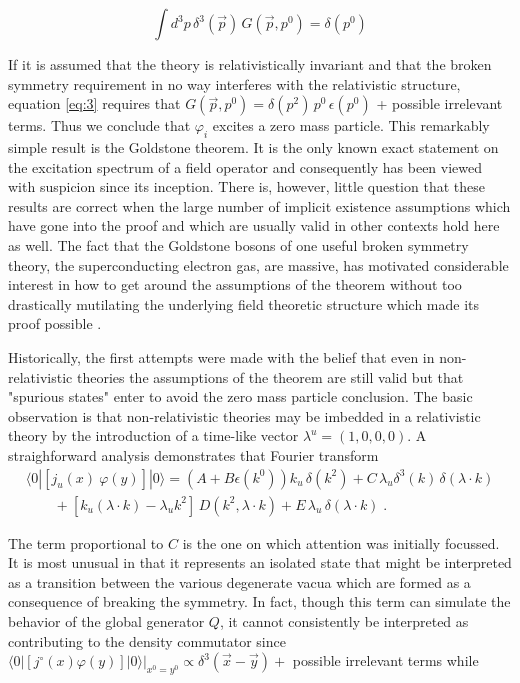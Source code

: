 \documentclass[%
  12pt,
  paper=letter,
  abstracton,
  pagesize=auto,
  version=last,
  DIV=calc
  ]{article}
\begin{document}
\begin{equation}
  \label{eq:3}
  \int d^{3}p\, \delta^{3}(\vec{p})\, G(\vec{p}, p^{0}) = \delta(p^{0})
\end{equation}

If it is assumed that the theory is relativistically invariant and
that the broken symmetry requirement in no way interferes with the
relativistic structure, equation \eqref{eq:3} requires that $G(\vec{p},
p^{0}) = \delta(p^{2})\, p^{0}\, \epsilon(p^{0})$ + possible
irrelevant terms.  Thus we conclude that $\varphi_i$ excites a zero
mass particle.  This remarkably simple result is the Goldstone
theorem.  It is the only known exact statement on the excitation
spectrum of a field operator and consequently has been viewed with
suspicion since its inception.  There is, however, little question
that these results are correct when the large number of implicit
existence assumptions which have gone into the proof and which are
usually valid in other contexts hold here as well.  The fact that the
Goldstone bosons of one useful broken symmetry theory, the
superconducting electron gas, are massive, has motivated considerable
interest in how to get around the assumptions of the theorem without
too drastically mutilating the underlying field theoretic structure
which made its proof possible \cite{5}.

Historically, the first attempts were made with the belief that even
in non-relativistic theories the assumptions of the theorem are still
valid but that "spurious states" enter to avoid the zero mass particle
conclusion.  The basic observation \cite{6} is that non-relativistic
theories may be imbedded in a relativistic theory by the introduction
of a time-like vector $\lambda^{u}=(1,0,0,0)$.  A straighforward
analysis demonstrates that Fourier transform
\begin{multline*}
  \langle 0 |\left[j_{u}
  (x)~\varphi(y)\right]| 0\rangle = (A + B\epsilon(k^{0}))k_{u}\,
  \delta(k^{2}) + C\, \lambda_{u}
  \delta^{3}(k)\, \delta(\lambda\cdot k) \\
  \qquad + [k_{u}(\lambda\cdot
  k) - \lambda_{u}k^{2}]\, D (k^{2}, \lambda\cdot
  k) + E\, \lambda_{u}\, \delta(\lambda\cdot k) \; .
\end{multline*}

The term proportional to $C$ is the one on which attention was
initially focussed. It is most unusual in that it represents an
isolated state that might be interpreted as a transition between the
various degenerate vacua which are formed as a consequence of breaking
the symmetry.  In fact, though this term can simulate the behavior of
the global generator $Q$, it cannot consistently be interpreted as
contributing to the density commutator since
$\langle 0 |[{j^{\circ}}(x)\varphi(y)]|0\rangle\big|_{{x^{0}=y^{0}}}
\propto \delta^3(\vec{x}-\vec{y}) +$ possible irrelevant terms
while
\end{document}

